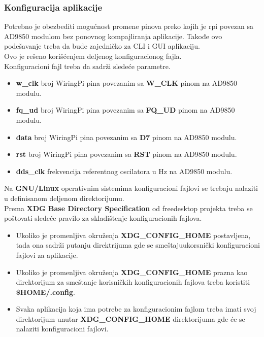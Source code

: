 \subsubsection{Konfiguracija aplikacije} \label{config_file}
Potrebno je obezbediti mogućnost promene pinova preko kojih je \gls{rpi} povezan
sa AD9850 modulom bez ponovnog kompajliranja aplikacije.
Takođe ovo podešavanje treba da bude zajedničko za CLI i GUI aplikaciju.\\
Ovo je rešeno korišćenjem deljenog konfiguracionog fajla. \\

\noindent
Konfiguracioni fajl treba da sadrži sledeće parametre.
\begin{itemize}
\item \textbf{w\_clk} broj WiringPi pina povezanim sa \textbf{W\_CLK} pinom na AD9850 modulu.
\item \textbf{fq\_ud} broj WiringPi pina povezanim sa \textbf{FQ\_UD} pinom na AD9850 modulu.
\item \textbf{data} broj WiringPi pina povezanim sa \textbf{D7} pinom na AD9850 modulu.
\item \textbf{rst} broj WiringPi pina povezanim sa \textbf{RST} pinom na AD9850 modulu.
\item \textbf{dds\_clk} frekvencija referentnog oscilatora u Hz na AD9850 modulu.
\end{itemize}

Na \textbf{GNU/Linux} operativnim sistemima konfiguracioni fajlovi se trebaju
nalaziti u definisanom deljenom direktorijumu. \\
Prema \textbf{XDG Base Directory Specification}\cite{xdg_spec} od freedesktop projekta
treba se poštovati sledeće pravilo za skladištenje konfiguracionih fajlova.

\begin{itemize}
  \item Ukoliko je promenljiva okruženja \textbf{XDG\_CONFIG\_HOME} postavljena,
    tada ona sadrži putanju direktrijuma gde se smeštajuukorsnički
    konfiguracioni fajlovi za aplikacije.
  \item Ukoliko je promenljiva okruženja \textbf{XDG\_CONFIG\_HOME} prazna kao
    direktorijum za smeštanje korisničkih konfiguracionih fajlova treba
    koristiti \textbf{\$HOME/.config}.
  \item Svaka aplikacija koja ima potrebe za konfiguracionim fajlom treba imati
    svoj direktorijum unutar \textbf{XDG\_CONFIG\_HOME} direktorijuma gde će se
    nalaziti konfiguracioni fajlovi.
\end{itemize}

